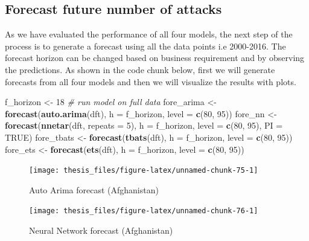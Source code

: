 \documentclass[11pt,oneside,a4paper]{reedthesis}
\newenvironment{Shaded}{\begin{snugshade}}{\end{snugshade}}
\newcommand{\KeywordTok}[1]{\textcolor[rgb]{0.13,0.29,0.53}{\textbf{#1}}}
\newcommand{\DataTypeTok}[1]{\textcolor[rgb]{0.13,0.29,0.53}{#1}}
\newcommand{\DecValTok}[1]{\textcolor[rgb]{0.00,0.00,0.81}{#1}}
\newcommand{\StringTok}[1]{\textcolor[rgb]{0.31,0.60,0.02}{#1}}
\newcommand{\CommentTok}[1]{\textcolor[rgb]{0.56,0.35,0.01}{\textit{#1}}}
\newcommand{\OtherTok}[1]{\textcolor[rgb]{0.56,0.35,0.01}{#1}}
\newcommand{\NormalTok}[1]{#1}
\begin{document}
\subsection{Forecast future number of
attacks}\label{forecast-future-number-of-attacks}

As we have evaluated the performance of all four models, the next step
of the process is to generate a forecast using all the data points i.e
2000-2016. The forecast horizon can be changed based on business
requirement and by observing the predictions. As shown in the code chunk
below, first we will generate forecasts from all four models and then we
will visualize the results with plots.
\begin{Shaded}
\begin{Highlighting}[]
\NormalTok{f_horizon <-}\StringTok{ }\DecValTok{18}
\CommentTok{# run model on full data}
\NormalTok{fore_arima <-}\StringTok{ }\KeywordTok{forecast}\NormalTok{(}\KeywordTok{auto.arima}\NormalTok{(dft), }\DataTypeTok{h =}\NormalTok{ f_horizon, }\DataTypeTok{level =} \KeywordTok{c}\NormalTok{(}\DecValTok{80}\NormalTok{, }\DecValTok{95}\NormalTok{))}
\NormalTok{fore_nn <-}\StringTok{ }\KeywordTok{forecast}\NormalTok{(}\KeywordTok{nnetar}\NormalTok{(dft, }\DataTypeTok{repeats =} \DecValTok{5}\NormalTok{), }\DataTypeTok{h =}\NormalTok{ f_horizon, }
                    \DataTypeTok{level =} \KeywordTok{c}\NormalTok{(}\DecValTok{80}\NormalTok{, }\DecValTok{95}\NormalTok{), }\DataTypeTok{PI =} \OtherTok{TRUE}\NormalTok{)}
\NormalTok{fore_tbats <-}\StringTok{ }\KeywordTok{forecast}\NormalTok{(}\KeywordTok{tbats}\NormalTok{(dft), }\DataTypeTok{h =}\NormalTok{ f_horizon, }\DataTypeTok{level =} \KeywordTok{c}\NormalTok{(}\DecValTok{80}\NormalTok{, }\DecValTok{95}\NormalTok{))}
\NormalTok{fore_ets <-}\StringTok{ }\KeywordTok{forecast}\NormalTok{(}\KeywordTok{ets}\NormalTok{(dft), }\DataTypeTok{h =}\NormalTok{ f_horizon, }\DataTypeTok{level =} \KeywordTok{c}\NormalTok{(}\DecValTok{80}\NormalTok{, }\DecValTok{95}\NormalTok{))}
\end{Highlighting}
\end{Shaded}
\begin{figure}
\texttt{[image: thesis\_files/figure-latex/unnamed-chunk-75-1]} \caption{Auto Arima forecast (Afghanistan)}\label{fig:unnamed-chunk-75}
\end{figure}
\begin{figure}
\texttt{[image: thesis\_files/figure-latex/unnamed-chunk-76-1]} \caption{Neural Network forecast (Afghanistan)}\label{fig:unnamed-chunk-76}
\end{figure}
\end{document}

